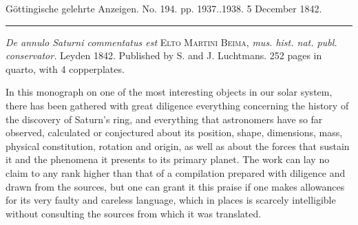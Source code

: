 \clearpage
{}
\hypertarget{native-659-middle}{}
\begin{center}\small Göttingische gelehrte Anzeigen. No. 194. pp. 1937..1938. 5 December 1842.\\[3pt]\rule{.72\linewidth}{.3pt}\end{center}

\emph{De annulo Saturni commentatus est} \textsc{Elto Martini Beima}, \emph{mus. hist. nat. publ. conservator.} Leyden 1842. Published by S. and J. Luchtmans. 252 pages in quarto, with 4 copperplates.

In this monograph on one of the most interesting objects in our solar system, there has been gathered with great diligence everything concerning the history of the discovery of Saturn's ring, and everything that astronomers have so far observed, calculated or conjectured about its position, shape, dimensions, mass, physical constitution, rotation and origin, as well as about the forces that sustain it and the phenomena it presents to its primary planet. The work can lay no claim to any rank higher than that of a compilation prepared with diligence and drawn from the sources, but one can grant it this praise if one makes allowances for its very faulty and careless language, which in places is scarcely intelligible without consulting the sources from which it was translated.
